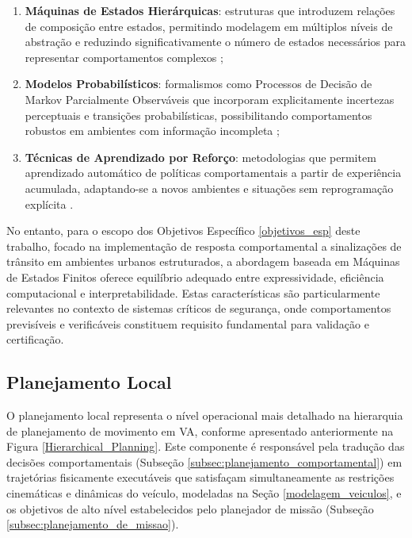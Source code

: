 \begin{enumerate}
    \item \textbf{Máquinas de Estados Hierárquicas}: estruturas que introduzem relações de composição entre estados, permitindo modelagem em múltiplos níveis de abstração e reduzindo significativamente o número de estados necessários para representar comportamentos complexos \cite{wei2014behavioral};
    
    \item \textbf{Modelos Probabilísticos}: formalismos como Processos de Decisão de Markov Parcialmente Observáveis que incorporam explicitamente incertezas perceptuais e transições probabilísticas, possibilitando comportamentos robustos em ambientes com informação incompleta \cite{sutton1998reinforcement};
    
    \item \textbf{Técnicas de Aprendizado por Reforço}: metodologias que permitem aprendizado automático de políticas comportamentais a partir de experiência acumulada, adaptando-se a novos ambientes e situações sem reprogramação explícita \cite{sutton1998reinforcement}.
\end{enumerate}

No entanto, para o escopo dos Objetivos Específico \ref{objetivos_esp} deste trabalho, focado na implementação de resposta comportamental a sinalizações de trânsito em ambientes urbanos estruturados, a abordagem baseada em Máquinas de Estados Finitos oferece equilíbrio adequado entre expressividade, eficiência computacional e interpretabilidade. Estas características são particularmente relevantes no contexto de sistemas críticos de segurança, onde comportamentos previsíveis e verificáveis constituem requisito fundamental para validação e certificação.

\subsection{Planejamento Local} \label{subsec:planejamento_local}

O planejamento local representa o nível operacional mais detalhado na hierarquia de planejamento de movimento em VA, conforme apresentado anteriormente na Figura \ref{Hierarchical_Planning}. Este componente é responsável pela tradução das decisões comportamentais (Subseção \ref{subsec:planejamento_comportamental}) em trajetórias fisicamente executáveis que satisfaçam simultaneamente as restrições cinemáticas e dinâmicas do veículo, modeladas na Seção \ref{modelagem_veiculos}, e os objetivos de alto nível estabelecidos pelo planejador de missão (Subseção \ref{subsec:planejamento_de_missao}). 

